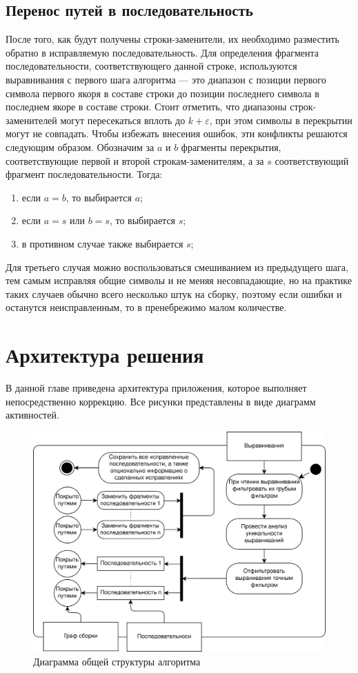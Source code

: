 \documentclass[14pt]{matmex-diploma-custom}
\begin{document}
\subsection{Перенос путей в последовательность}
После того, как будут получены строки-заменители, их необходимо разместить обратно в исправляемую последовательность. Для определения фрагмента последовательности, соответствующего данной строке, используются выравнивания с первого шага алгоритма --- это диапазон с позиции первого символа первого якоря в составе строки до позиции последнего символа в последнем якоре в составе строки. Стоит отметить, что диапазоны строк-заменителей могут пересекаться вплоть до $k+\varepsilon$, при этом символы в перекрытии могут не совпадать. Чтобы избежать внесения ошибок, эти конфликты решаются следующим образом. Обозначим за $a$ и $b$ фрагменты перекрытия, соответствующие первой и второй строкам-заменителям, а за $s$ соответствующий фрагмент последовательности. Тогда:
\begin{enumerate}
    \item если $a=b$, то выбирается $a$;
    \item если $a=s$ или $b=s$, то выбирается $s$;
    \item в противном случае также выбирается $s$;
\end{enumerate}
Для третьего случая можно воспользоваться смешиванием из предыдущего шага, тем самым исправляя общие символы и не меняя несовпадающие, но на практике таких случаев обычно всего несколько штук на сборку, поэтому если ошибки и останутся неисправленным, то в пренебрежимо малом количестве.

\section{Архитектура решения}
В данной главе приведена архитектура приложения, которое выполняет непосредственно коррекцию. Все рисунки представлены в виде диаграмм активностей.

\begin{figure}[h]
    \centering
    \includegraphics{NIR_arch-Page-4.png}
    \caption{Диаграмма общей структуры алгоритма}
    \label{fig:arch:top_lvl}
\end{figure}
\end{document}
